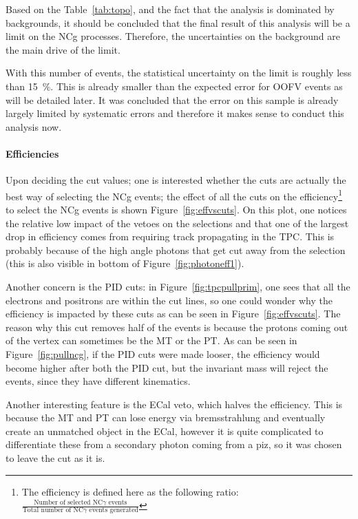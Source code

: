 Based on the Table~\ref{tab:topo}, and the fact that the analysis is
dominated by backgrounds, it should be concluded that the final result
of this analysis will be a limit on the \Gls{NCg}
processes. Therefore, the uncertainties on the background are the main
drive of the limit.

With this number of events, the statistical uncertainty on the limit
is roughly less than 15~\%. This is already smaller than the expected
error for \Gls{OOFV} events as will be detailed later. It was
concluded that the error on this sample is already largely limited by
systematic errors and therefore it makes sense to conduct this
analysis now.

\clearpage
\paragraph{Efficiencies}

Upon deciding the cut values; one is interested whether the cuts are
actually the best way of selecting the \Gls{NCg} events; the effect of
all the cuts on the efficiency\footnote{The efficiency is defined here
  as the following ratio:
  $\frac{\text{Number of selected NC}\gamma\text{ events}}{\text{Total
      number of NC}\gamma\text{ events generated}}$} to select the
\Gls{NCg} events is shown Figure~\ref{fig:effvscuts}. On this plot,
one notices the relative low impact of the vetoes on the selections
and that one of the largest drop in efficiency comes from requiring
track propagating in the \Gls{TPC}. This is probably because of the
high angle photons that get cut away from the selection (this is also
visible in bottom of Figure~\ref{fig:photoneff1}).

Another concern is the \Gls{PID} cuts: in
Figure~\ref{fig:tpcpullprim}, one sees that all the electrons and
positrons are within the cut lines, so one could wonder why the
efficiency is impacted by these cuts as can be seen in
Figure~\ref{fig:effvscuts}. The reason why this cut removes half of
the events is because the protons coming out of the vertex can
sometimes be the \Gls{MT} or the \Gls{PT}. As can be seen in
Figure~\ref{fig:pullncg}, if the \Gls{PID} cuts were made looser, the
efficiency would become higher after both the \Gls{PID} cut, but the
invariant mass will reject the events, since they have different
kinematics.

Another interesting feature is the \Gls{ECal} veto, which halves the
efficiency. This is because the \Gls{MT} and \Gls{PT} can lose energy
via bremsstrahlung and eventually create an unmatched object in the
\Gls{ECal}, however it is quite complicated to differentiate these
from a secondary photon coming from a \Gls{piz}, so it was chosen to
leave the cut as it is.

